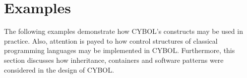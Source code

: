 %
%
%
%
%
%

\chapter{Examples}
\label{examples_heading}

The following examples demonstrate how CYBOL's constructs may be used in
practice. Also, attention is payed to how control structures of classical
programming languages may be implemented in CYBOL. Furthermore, this section
discusses how inheritance, containers and software patterns were considered in
the design of CYBOL.







